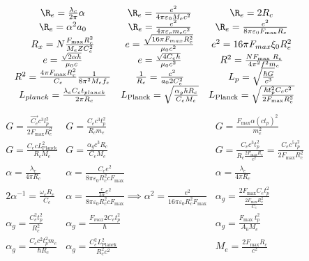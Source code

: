     \begin{gather*}
        \begin{array}{ccc}
            \R_e = \frac{\lambda_c}{2 \pi} \alpha & \R_e = \frac{e^2}{4 \pi \varepsilon_0 M_e c^2} & \R_e = 2 R_c \\
            \R_e = \alpha^2 a_0 & \R_e = \frac{e^2}{4 \pi \varepsilon_c m_c c^2} & \R_e = \frac{e^2}{8 \pi \varepsilon_0 F_{\text{max}} R_c} \\
            R_x = N \frac{F_{\max} R_c^2}{M_e Z C_e^2} & e = \frac{\sqrt{16 \pi F_{max} R_c^2}}{\mu_0 c^2} & e^2 = 16 \pi F_{max} \xi_0 R_e^2 \\
            e = \frac{\sqrt{2 \alpha h}}{\mu_0 c} & e = \frac{\sqrt{4 C_e h}}{\mu_0 c^2} & R^2 = \frac{N F_{\text {max }} R_c}{4 \pi^2 f^2 m_e} \\
            R^2 = \frac{4 \pi F_{\text{max}} R_c^2}{C_e} \frac{1}{8 \pi^2 M_e f_e} & \frac{1}{R_c} = \frac{c^2}{a_0 2 C_e^2} & {L_p} = \sqrt{\frac{\hbar G}{c^3}} \\
            L_{planck} = \frac{\lambda_e C_e t_{planck}}{2 \pi R_c} & L_{\text{Planck}} = \sqrt{\frac{\alpha_g \hbar R_c}{C_e M_e}} & L_{\text{Planck}} = \sqrt{\frac{\hbar t_p^2 C_e c^2}{2 F_{\text{max}} R_c^2}} \\
        \end{array}
    \end{gather*}
\begin{gather*}
    \begin{array}{ccc}
            G = \frac{\vec{C_e} c^3 l_p^2}{2 F_{\max } R_c^2} & G = \frac{C_e c^3 t_p^2}{R_c m_e} & G = \frac{F_{\operatorname{max}} \alpha (c t_p)^2}{m_e^2} \\
            G = \frac{C_e c L_{\text{Planck}}^2}{R_c M_e} & G = \frac{\alpha_g c^3 R_c}{C_e M_e} & G = \frac{C_e c^3 t_p^2}{R_c \frac{2 F_{\text{max}} R_c}{c^2}} = \frac{C_e c^5 t_p^2}{2 F_{\text{max}} R_c^2} \\
            \alpha = \frac{\lambda_e}{4 \pi R_c} & \alpha = \frac{C_e e^2}{8 \pi \varepsilon_0 R_c^2 c F_{\text{max}}} & \alpha = \frac{\lambda_c}{4 \pi R_c} \\
            2\alpha^{-1} = \frac{\omega_c R_c}{C_e} & \alpha = \frac{\frac{c}{2 \alpha} e^2}{8 \pi \varepsilon_0 R_c^2 c F_{\text{max}}} \implies \alpha^2 = \frac{e^2}{16 \pi \varepsilon_0 R_c^2 F_{\text{max}}} & \alpha_g = \frac{2F_{\text{max}} C_e t_p^2}{\frac{2F_{\text{max}} R_c^2}{C_e}} \\
            \alpha_g = \frac{C_e^2 t_p^2}{R_c^2} & \alpha_g = \frac{F_{max} 2 C_e t_p^2}{\hbar} & \alpha_g = \frac{F_{\text {max }} t_p^2}{A_0 M_e} \\
            \alpha_g = \frac{C_e c^2 t_p^2 m_e}{\hbar R_c} & \alpha_g = \frac{C_e^2 L_{\text{Planck}}^2}{R_c^2 c^2} & M_e = \frac{2 F_{\text{max}} R_c}{c^2} \\
        \end{array}
    \end{gather*}
